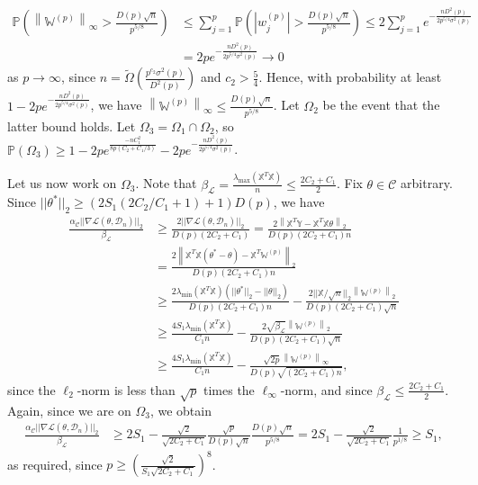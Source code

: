 \documentclass{article}
\begin{document}
\begin{align*}
\mathbb{P}\left(\left\|\mathbb{W}^{(p)}\right\|_\infty > \frac{D(p)\sqrt{n}}{p^{5/8}}\right) &\leq \sum_{j = 1}^p\mathbb{P}\left(\left|w_j^{(p)}\right| > \frac{D(p)\sqrt{n}}{p^{5/8}}\right) \leq 2\sum_{j = 1}^pe^{-\frac{nD^2(p)}{2p^{5/4}\sigma^2(p)}}\\
&= 2pe^{-\frac{nD^2(p)}{2p^{5/4}\sigma^2(p)}} \rightarrow 0
\end{align*}
as $p \rightarrow \infty$, since $n = \widetilde{\Omega}\left(\frac{p^{c_2}\sigma^2(p)}{D^2(p)}\right)$ and $c_2 > \frac{5}{4}$. Hence, with probability at least $1 - 2pe^{-\frac{nD^2(p)}{2p^{5/4}\sigma^2(p)}}$, we have $\left\|\mathbb{W}^{(p)}\right\|_\infty \leq \frac{D(p)\sqrt{n}}{p^{5/8}}$. Let $\Omega_2$ be the event that the latter bound holds. Let $\Omega_3 = \Omega_1 \cap \Omega_2$, so $\mathbb{P}(\Omega_3) \geq 1 - 2pe^{\frac{-nC_1^2}{8p\left(C_2+ C_1/3\right)}} - 2pe^{-\frac{nD^2(p)}{2p^{5/4}\sigma^2(p)}}$.

Let us now work on $\Omega_3$. Note that $\beta_{\mathcal{L}} = \frac{\lambda_{\max}\left(\mathbb{X}^T\mathbb{X}\right)}{n} \leq \frac{2C_2 + C_1}{2}$. Fix $\theta \in \mathcal{C}$ arbitrary. Since $||\theta^*||_2 \geq (2S_1(2C_2/C_1 + 1) + 1)D(p)$, we have
\begin{align*}
\frac{\alpha_{\mathcal{C}}||\nabla \mathcal{L}(\theta, \mathcal{D}_n)||_2}{\beta_{\mathcal{L}}} &\geq \frac{2||\nabla \mathcal{L}(\theta, \mathcal{D}_n)||_2}{D(p)(2C_2 + C_1)} = \frac{2\left\|\mathbb{X}^T\mathbb{Y} - \mathbb{X}^T\mathbb{X}\theta\right\|_2}{D(p)(2C_2 + C_1)n}\\
&= \frac{2\left\|\mathbb{X}^T\mathbb{X}(\theta^* - \theta) - \mathbb{X}^T\mathbb{W}^{(p)}\right\|_2}{D(p)(2C_2 + C_1)n}\\
&\geq \frac{2\lambda_{\min}\left(\mathbb{X}^T\mathbb{X}\right)(||\theta^*||_2 - ||\theta||_2)}{D(p)(2C_2 + C_1)n} - \frac{2||\mathbb{X}/\sqrt{n}||_2\left\|\mathbb{W}^{(p)}\right\|_2}{D(p)(2C_2 + C_1)\sqrt{n}}\\
&\geq \frac{4S_1\lambda_{\min}\left(\mathbb{X}^T\mathbb{X}\right)}{C_1n} - \frac{2\sqrt{\beta_{\mathcal{L}}}\left\|\mathbb{W}^{(p)}\right\|_2}{D(p)(2C_2 + C_1)\sqrt{n}}\\
&\geq \frac{4S_1\lambda_{\min}\left(\mathbb{X}^T\mathbb{X}\right)}{C_1n} - \frac{\sqrt{2p}\left\|\mathbb{W}^{(p)}\right\|_\infty}{D(p)\sqrt{(2C_2 + C_1)n}},
\end{align*}
since the $\ell_2$-norm is less than $\sqrt{p}$ times the $\ell_{\infty}$-norm, and since $\beta_{\mathcal{L}} \leq \frac{2C_2 + C_1}{2}$. Again, since we are on $\Omega_3$, we obtain
\begin{align*}
\frac{\alpha_{\mathcal{C}}||\nabla \mathcal{L}(\theta, \mathcal{D}_n)||_2}{\beta_{\mathcal{L}}} &\geq 2S_1 - \frac{\sqrt{2}}{\sqrt{2C_2 + C_1}}\frac{\sqrt{p}}{D(p)\sqrt{n}}\frac{D(p)\sqrt{n}}{p^{5/8}} = 2S_1 - \frac{\sqrt{2}}{\sqrt{2C_2 + C_1}}\frac{1}{p^{1/8}} \geq S_1,
\end{align*}
as required, since $p \geq \left(\frac{\sqrt{2}}{S_1\sqrt{2C_2 + C_1}}\right)^8$.
\end{document}
